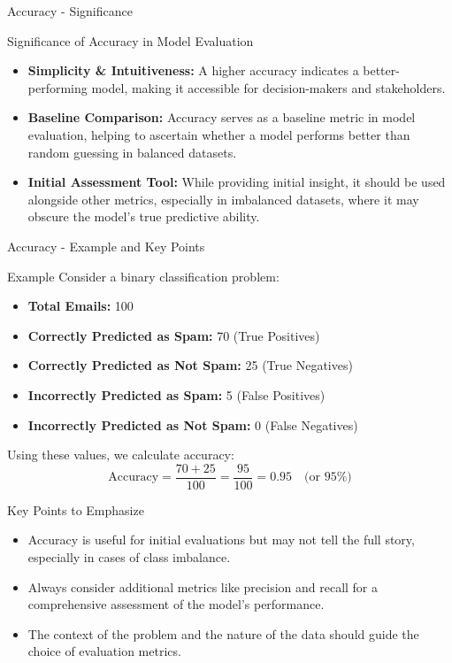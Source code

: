 \documentclass[aspectratio=169]{beamer}
\begin{document}
\begin{frame}[fragile]{Accuracy - Significance}
    \begin{block}{Significance of Accuracy in Model Evaluation}
        \begin{itemize}
            \item \textbf{Simplicity \& Intuitiveness:} A higher accuracy indicates a better-performing model, making it accessible for decision-makers and stakeholders.
            \item \textbf{Baseline Comparison:} Accuracy serves as a baseline metric in model evaluation, helping to ascertain whether a model performs better than random guessing in balanced datasets.
            \item \textbf{Initial Assessment Tool:} While providing initial insight, it should be used alongside other metrics, especially in imbalanced datasets, where it may obscure the model's true predictive ability.
        \end{itemize}
    \end{block}
\end{frame}

\begin{frame}[fragile]{Accuracy - Example and Key Points}
    \begin{block}{Example}
        Consider a binary classification problem:
        \begin{itemize}
            \item \textbf{Total Emails:} 100
            \item \textbf{Correctly Predicted as Spam:} 70 (True Positives)
            \item \textbf{Correctly Predicted as Not Spam:} 25 (True Negatives)
            \item \textbf{Incorrectly Predicted as Spam:} 5 (False Positives)
            \item \textbf{Incorrectly Predicted as Not Spam:} 0 (False Negatives)
        \end{itemize}
        Using these values, we calculate accuracy:
        \begin{equation}
            \text{Accuracy} = \frac{70 + 25}{100} = \frac{95}{100} = 0.95 \quad \text{(or 95\%)}
        \end{equation}
    \end{block}
    \begin{block}{Key Points to Emphasize}
        \begin{itemize}
            \item Accuracy is useful for initial evaluations but may not tell the full story, especially in cases of class imbalance.
            \item Always consider additional metrics like precision and recall for a comprehensive assessment of the model’s performance.
            \item The context of the problem and the nature of the data should guide the choice of evaluation metrics.
        \end{itemize}
    \end{block}
\end{frame}
\end{document}

